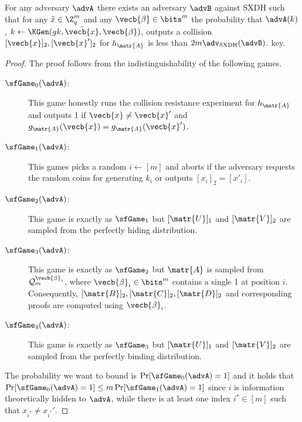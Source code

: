 \begin{lemma}
For any adversary $\advA$ there exists an adversary $\advB$ against SXDH such that for any $\tilde{x}\in\Z_q^m$ and any $\vecb{\beta}\in\bits^m$  the probability that $\advA(k)$, $k\gets\KGen(gk,\tilde{\vecb{x}},\vecb{\beta})$, outputs a collision $[\vecb{x}]_2,[\vecb{x}']_2$ for $h_\matr{A}$  is less than $2m \adv_{\mathrm{SXDH}}(\advB)$. key.
\end{lemma}
\begin{proof}
The proof follows from the indistinguishability of the following games.
\begin{description}
\item[$\sfGame_0(\advA)$:] This game honestly runs the collision resistance experiment for $h_{\matr{A}}$ and outputs 1 if $\vecb{x}\neq\vecb{x}'$ and $g_\matr{A}(\vecb{x})=g_{\matr{A}}(\vecb{x}')$.
\item[$\sfGame_1(\advA)$:] This games picks a random $i\gets[m]$ and aborts if the adversary requests the random coins for generating $k_i$ or outputs $[x_i]_2=[x'_i]$.
\item[$\sfGame_2(\advA)$:] This game is exactly as $\sfGame_1$ but $[\matr{U}]_1$ and $[\matr{V}]_2$ are sampled from the perfectly hiding distribution.
\item[$\sfGame_3(\advA)$:] This game is exactly as $\sfGame_2$ but $\matr{A}$ is sampled from $\mathcal{Q}_m^{\vecb{\beta}_i}$, where $\vecb{\beta}_i\in\bits^m$ contains a single 1 at position $i$. Consequently, $[\matr{B}]_2,[\matr{C}]_2,[\matr{D}]_2$ and corresponding proofs are computed using $\vecb{\beta}_i$.
\item[$\sfGame_4(\advA)$:] This game is exactly as $\sfGame_3$ but $[\matr{U}]_1$ and $[\matr{V}]_2$ are sampled from the perfectly binding distribution.
\end{description}
The probability we want to bound is $\Pr[\sfGame_0(\advA)=1]$ and it holds that $\Pr[\sfGame_0(\advA)=1]\leq m\Pr[\sfGame_1(\advA)=1]$ since $i$ is information theoretically hidden to $\advA$, while there is at least one index $i^*\in[m]$ such that $x_{i^*} \neq x_{i^*}'$.


\end{proof}
